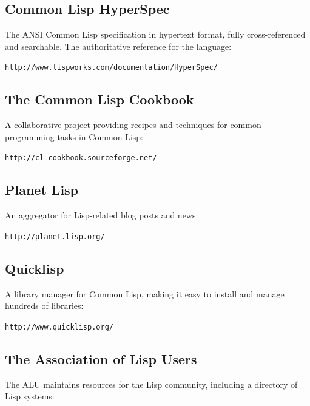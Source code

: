 \subsection{Common Lisp HyperSpec}

The ANSI Common Lisp specification in hypertext format, fully cross-referenced and searchable. The authoritative reference for the language:

\begin{center}
\texttt{http://www.lispworks.com/documentation/HyperSpec/}
\end{center}

\subsection{The Common Lisp Cookbook}

A collaborative project providing recipes and techniques for common programming tasks in
Common Lisp:

\begin{center}
\texttt{http://cl-cookbook.sourceforge.net/}
\end{center}

\subsection{Planet Lisp}

An aggregator for Lisp-related blog posts and news:

\begin{center}
\texttt{http://planet.lisp.org/}
\end{center}

\subsection{Quicklisp}

A library manager for Common Lisp, making it easy to install and manage hundreds of
libraries:

\begin{center}
\texttt{http://www.quicklisp.org/}
\end{center}

\subsection{The Association of Lisp Users}

The ALU maintains resources for the Lisp community, including a directory of Lisp systems:


